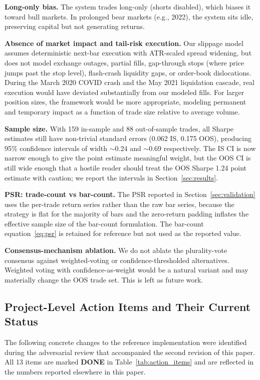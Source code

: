 \documentclass{article}
\begin{document}
\textbf{Long-only bias.} The system trades long-only (shorts disabled), which biases it toward bull markets.
In prolonged bear markets (e.g., 2022), the system sits idle, preserving capital but not generating returns.

\textbf{Absence of market impact and tail-risk execution.} Our slippage model assumes deterministic next-bar execution with ATR-scaled spread widening, but does not model exchange outages, partial fills, gap-through stops (where price jumps past the stop level), flash-crash liquidity gaps, or order-book dislocations.
During the March 2020 COVID crash and the May 2021 liquidation cascade, real execution would have deviated substantially from our modeled fills.
For larger position sizes, the \citet{almgren2001optimal} framework would be more appropriate, modeling permanent and temporary impact as a function of trade size relative to average volume.

\textbf{Sample size.} With 159 in-sample and 88 out-of-sample trades, all Sharpe estimates still have non-trivial standard errors (0.062 IS, 0.175 OOS), producing 95\% confidence intervals of width $\sim 0.24$ and $\sim 0.69$ respectively.
The IS CI is now narrow enough to give the point estimate meaningful weight, but the OOS CI is still wide enough that a hostile reader should treat the OOS Sharpe 1.24 point estimate with caution; we report the intervals in Section~\ref{sec:results}.

\textbf{PSR: trade-count vs bar-count.} The PSR reported in Section~\ref{sec:validation} uses the per-trade return series rather than the raw bar series, because the strategy is flat for the majority of bars and the zero-return padding inflates the effective sample size of the bar-count formulation. The bar-count equation~\eqref{eq:psr} is retained for reference but not used as the reported value.

\textbf{Consensus-mechanism ablation.} We do not ablate the plurality-vote consensus against weighted-voting or confidence-thresholded alternatives.
Weighted voting with confidence-as-weight would be a natural variant and may materially change the OOS trade set.
This is left as future work.

\subsection{Project-Level Action Items and Their Current Status}
\label{sec:action_items}

The following concrete changes to the reference implementation were identified during the adversarial review that accompanied the second revision of this paper.
All 13 items are marked \textbf{DONE} in Table~\ref{tab:action_items} and are reflected in the numbers reported elsewhere in this paper.
\end{document}
